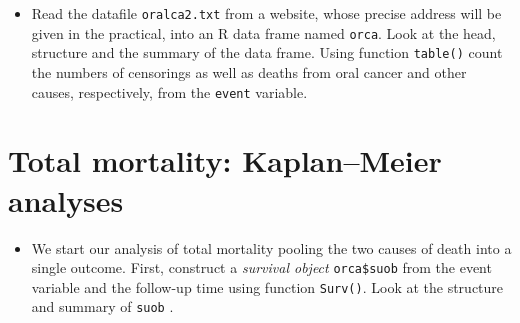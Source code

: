 \documentclass[
]{book}
\newenvironment{Shaded}{\begin{snugshade}}{\end{snugshade}}
\newcommand{\AttributeTok}[1]{\textcolor[rgb]{0.13,0.29,0.53}{#1}}
\newcommand{\ConstantTok}[1]{\textcolor[rgb]{0.56,0.35,0.01}{#1}}
\newcommand{\DecValTok}[1]{\textcolor[rgb]{0.00,0.00,0.81}{#1}}
\newcommand{\FunctionTok}[1]{\textcolor[rgb]{0.13,0.29,0.53}{\textbf{#1}}}
\newcommand{\NormalTok}[1]{#1}
\newcommand{\OtherTok}[1]{\textcolor[rgb]{0.56,0.35,0.01}{#1}}
\newcommand{\SpecialCharTok}[1]{\textcolor[rgb]{0.81,0.36,0.00}{\textbf{#1}}}
\newcommand{\StringTok}[1]{\textcolor[rgb]{0.31,0.60,0.02}{#1}}
\providecommand{\tightlist}{%
  \setlength{\itemsep}{0pt}\setlength{\parskip}{0pt}}
\begin{document}
\begin{itemize}
\tightlist
\item
  Read the datafile \texttt{oralca2.txt} from
  a website, whose precise address will be given in the practical,
  into an R data frame named \texttt{orca}.
  Look at the head, structure and the summary of the data frame.
  Using function \texttt{table()} count the numbers of censorings
  as well as deaths from oral cancer and other causes, respectively,
  from the \texttt{event} variable.
\end{itemize}

\begin{Shaded}
\end{Shaded}

\section{Total mortality: Kaplan--Meier analyses}\label{total-mortality-kaplanmeier-analyses}

\begin{itemize}
\tightlist
\item
  We start our analysis of total mortality pooling the two causes of death into
  a single outcome.
  First, construct a \emph{survival object} \texttt{orca\$suob} from
  the event variable and the follow-up time using function \texttt{Surv()}.
  Look at the structure and summary of \texttt{suob} .
\end{itemize}
\end{document}
